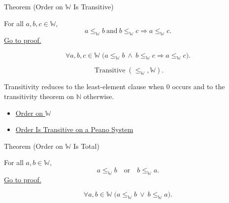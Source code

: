 \begin{theorembox}{Theorem (Order on \texorpdfstring{$\mathbb{W}$}{W} Is Transitive)}
\begin{theorem}
\label{thm:order-on-w-transitive}
For all $a,b,c\in\mathbb{W}$,
\[
a\leq_{\mathbb{W}}b\ \text{and}\ b\leq_{\mathbb{W}}c
\Longrightarrow a\leq_{\mathbb{W}}c.
\]
\hyperref[prf:order-on-w-transitive]{Go to proof.}
\end{theorem}
\end{theorembox}

\begin{remark*}
\[
\forall a,b,c\in\mathbb{W}\;
\bigl(a\leq_{\mathbb{W}}b\ \wedge\ b\leq_{\mathbb{W}}c
\Longrightarrow a\leq_{\mathbb{W}}c\bigr).
\]
\end{remark*}

\begin{remark*}
\[
\operatorname{Transitive}(\leq_{\mathbb{W}},\mathbb{W}).
\]
\end{remark*}

\begin{remark*}[Interpretation]
Transitivity reduces to the least-element clause when $0$ occurs and to the
transitivity theorem on $\mathbb{N}$ otherwise.
\end{remark*}

\begin{dependencies}
\begin{itemize}
  \item \hyperref[def:order-on-w]{Order on $\mathbb{W}$}
  \item \hyperref[thm:order-transitive-on-peano-system]{Order Is Transitive on a Peano System}
\end{itemize}
\end{dependencies}

\begin{theorembox}{Theorem (Order on \texorpdfstring{$\mathbb{W}$}{W} Is Total)}
\begin{theorem}
\label{thm:order-on-w-total}
For all $a,b\in\mathbb{W}$,
\[
a\leq_{\mathbb{W}}b
\quad\text{or}\quad
b\leq_{\mathbb{W}}a.
\]
\hyperref[prf:order-on-w-total]{Go to proof.}
\end{theorem}
\end{theorembox}

\begin{remark*}
\[
\forall a,b\in\mathbb{W}\;
\bigl(a\leq_{\mathbb{W}}b\ \vee\ b\leq_{\mathbb{W}}a\bigr).
\]
\end{remark*}

